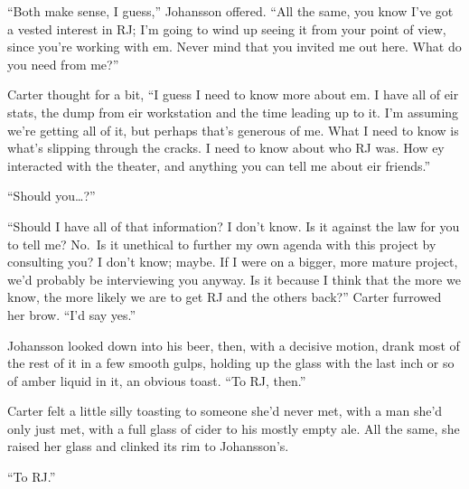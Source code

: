 ``Both make sense, I guess,'' Johansson offered. ``All the same, you know I've got a vested interest in RJ; I'm going to wind up seeing it from your point of view, since you're working with em. Never mind that you invited me out here. What do you need from me?''

Carter thought for a bit, ``I guess I need to know more about em. I have all of eir stats, the dump from eir workstation and the time leading up to it. I'm assuming we're getting all of it, but perhaps that's generous of me. What I need to know is what's slipping through the cracks. I need to know about who RJ was. How ey interacted with the theater, and anything you can tell me about eir friends.''

``Should you\ldots{}?''

``Should I have all of that information? I don't know. Is it against the law for you to tell me? No.~Is it unethical to further my own agenda with this project by consulting you? I don't know; maybe. If I were on a bigger, more mature project, we'd probably be interviewing you anyway. Is it because I think that the more we know, the more likely we are to get RJ and the others back?'' Carter furrowed her brow. ``I'd say yes.''

Johansson looked down into his beer, then, with a decisive motion, drank most of the rest of it in a few smooth gulps, holding up the glass with the last inch or so of amber liquid in it, an obvious toast. ``To RJ, then.''

Carter felt a little silly toasting to someone she'd never met, with a man she'd only just met, with a full glass of cider to his mostly empty ale. All the same, she raised her glass and clinked its rim to Johansson's.

``To RJ.''
